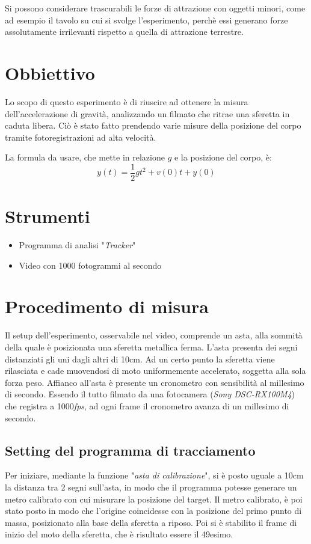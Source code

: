 \documentclass[12pt, a4paper]{article}
\begin{document}
Si possono considerare trascurabili le forze di attrazione con oggetti minori, come ad esempio il tavolo su cui si svolge l'esperimento, perchè essi generano forze assolutamente irrilevanti rispetto a quella di attrazione terrestre.

\section{Obbiettivo}
\label{sezione obbiettivi}
Lo scopo di questo esperimento è di riuscire ad ottenere la misura dell'accelerazione di gravità, analizzando un filmato che ritrae una sferetta in caduta libera. 
Ciò è stato fatto prendendo varie misure della posizione del corpo tramite fotoregistrazioni ad alta velocità. 

La formula da usare, che mette in relazione $g$ e la posizione del corpo, è:
\begin{equation*}
    y(t) = \frac{1}{2}gt^2+ v(0)t+y(0)
\end{equation*}


\section{Strumenti}
\begin{itemize}
\setlength\itemsep{0mm}
    \item Programma di analisi "\textit{Tracker}"
    \item Video con 1000 fotogrammi al secondo
\end{itemize}

\section{Procedimento di misura}
Il setup dell'esperimento, osservabile nel video, comprende un asta, alla sommità della quale è posizionata una sferetta metallica ferma. L'asta presenta dei segni distanziati gli uni dagli altri di 10cm. 
Ad un certo punto la sferetta viene rilasciata e cade muovendosi di moto uniformemente accelerato, soggetta alla sola forza peso. Affianco all'asta è presente un cronometro con sensibilità al millesimo di secondo. 
Essendo il tutto filmato da una fotocamera (\textit{Sony DSC-RX100M4}) che registra a 1000\textit{fps}, ad ogni frame il cronometro avanza di un millesimo di secondo.

  
\subsection{Setting del programma di tracciamento}
Per iniziare, mediante la funzione "\textit{asta di calibrazione}", si è posto uguale a 10cm la distanza tra 2 segni sull'asta, in modo che il programma potesse generare un metro calibrato con cui misurare la posizione del target. Il metro calibrato, è poi stato posto in modo che l'origine coincidesse con la posizione del primo punto di massa, posizionato alla base della sferetta a riposo. Poi si è stabilito il frame di inizio del moto della sferetta, che è risultato essere il 49esimo. 
\end{document}
